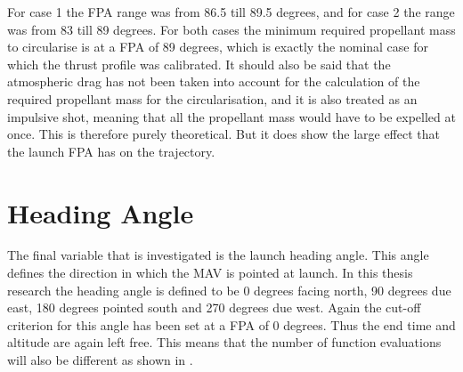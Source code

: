 \noindent
For case 1 the \ac{FPA} range was from 86.5 till 89.5 degrees, and for case 2 the range was from 83 till 89 degrees. For both cases the minimum required propellant mass to circularise is at a \ac{FPA} of 89 degrees, which is exactly the nominal case for which the thrust profile was calibrated. It should also be said that the atmospheric drag has not been taken into account for the calculation of the required propellant mass for the circularisation, and it is also treated as an impulsive shot, meaning that all the propellant mass would have to be expelled at once. This is therefore purely theoretical. But it does show the large effect that the launch \ac{FPA} has on the trajectory.


%
%

\section{Heading Angle}
\label{sec:headingAngle}
The final variable that is investigated is the launch heading angle. This angle defines the direction in which the \ac{MAV} is pointed at launch. In this thesis research the heading angle is defined to be 0 degrees facing north, 90 degrees due east, 180 degrees pointed south and 270 degrees due west. Again the cut-off criterion for this angle has been set at a \ac{FPA} of 0 degrees. Thus the end time and altitude are again left free. This means that the number of function evaluations will also be different as shown in .


%


